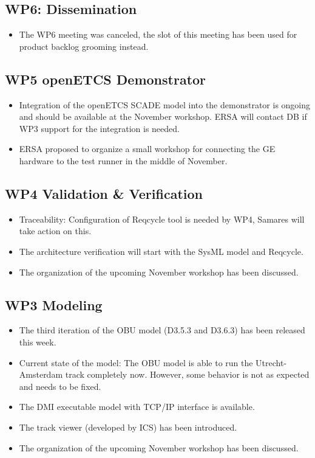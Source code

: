 \documentclass[a4paper, 11pt]{article}
\begin{document}
\subsection{WP6: Dissemination}
\begin{itemize}
\item The WP6 meeting was canceled, the slot of this meeting has been used for product backlog grooming instead.
\end{itemize}

\subsection{WP5 openETCS Demonstrator}
\begin{itemize}
\item Integration of the openETCS SCADE model into the demonstrator is ongoing and should be available at the November workshop. ERSA will contact DB if WP3 support for the integration is needed.
\item ERSA proposed to organize a small workshop for connecting the GE hardware to the test runner in the middle of November.
\end{itemize}

\subsection{WP4 Validation \& Verification}
\begin{itemize}
\item Traceability: Configuration of Reqcycle tool is needed by WP4, Samares will take action on this.
\item The architecture verification will start with the SysML model and Reqcycle.
\item The organization of the upcoming November workshop has been discussed.
\end{itemize}

\subsection{WP3 Modeling}
\begin{itemize}
\item The third iteration of the OBU model (D3.5.3 and D3.6.3) has been released this week.
\item Current state of the model: The OBU model is able to run the Utrecht-Amsterdam track completely now. However, some behavior is not as expected and needs to be fixed.
\item The DMI executable model with TCP/IP interface is available.
\item The track viewer (developed by ICS) has been introduced.
\item The organization of the upcoming November workshop has been discussed.
\end{itemize}
\end{document}
